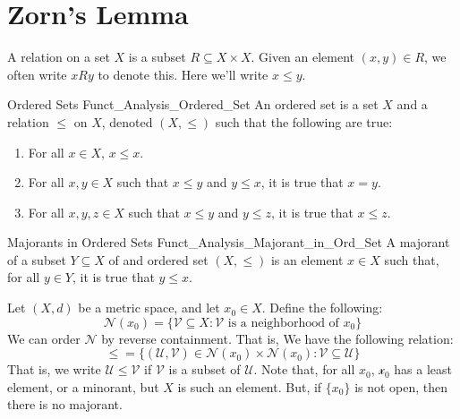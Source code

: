     \section{Zorn's Lemma}
        A relation on a set $X$ is a subset
        $R\subseteq{X}\times{X}$. Given an element $(x,y)\in{R}$,
        we often write $xRy$ to denote this. Here we'll write
        $x\leq{y}$.
        \begin{ldefinition}{Ordered Sets}
              {Funct_Analysis_Ordered_Set}
            An ordered set is a set $X$ and a relation
            $\leq$ on $X$, denoted $(X,\leq)$ such that
            the following are true:
            \begin{enumerate}
                \item For all $x\in{X}$, $x\leq{x}$.
                \item For all $x,y\in{X}$ such that $x\leq{y}$ and
                      $y\leq{x}$, it is true that $x=y$.
                \item For all $x,y,z\in{X}$ such that $x\leq{y}$
                      and $y\leq{z}$, it is true that $x\leq{z}$.
            \end{enumerate}
        \end{ldefinition}
        \begin{ldefinition}{Majorants in Ordered Sets}
              {Funct_Analysis_Majorant_in_Ord_Set}
            A majorant of a subset $Y\subseteq{X}$ of
            and ordered set $(X,\leq)$ is an element $x\in{X}$
            such that, for all $y\in{Y}$, it is true that
            $y\leq{x}$.
        \end{ldefinition}
        \begin{lexample}
            Let $(X,d)$ be a metric space, and let
            $x_{0}\in{X}$. Define the following:
            \begin{equation}
                \mathscr{N}(x_{0})=
                \big\{\mathcal{V}\subseteq{X}:\mathcal{V}
                    \textrm{ is a neighborhood of $x_{0}$}\big\}
            \end{equation}
            We can order $\mathscr{N}$ by reverse containment.
            That is, We have the following relation:
            \begin{equation}
                \leq=\big\{(\mathcal{U},\mathcal{V})\in
                    \mathscr{N}(x_{0})\times\mathscr{N}(x_{0})
                    :\mathcal{V}\subseteq\mathcal{U}\big\}
            \end{equation}
            That is, we write $\mathcal{U}\leq\mathcal{V}$ if
            $\mathcal{V}$ is a subset of $\mathcal{U}$. Note
            that, for all $x_{0}$,
            $\mathscr{x_{0}}$ has a least element, or a minorant,
            but $X$ is such an element. But, if $\{x_{0}\}$ is
            not open, then there is no majorant.
        \end{lexample}
